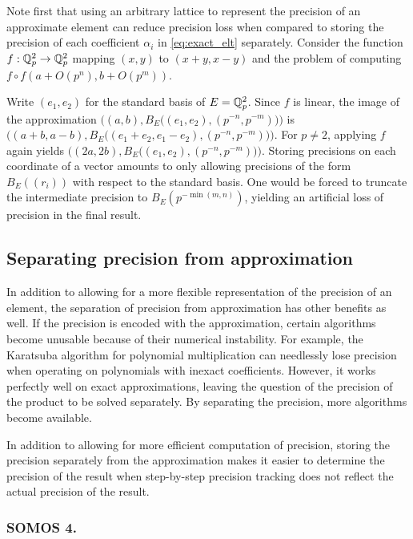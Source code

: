 \documentclass{lms}
\begin{document}
Note first that using an arbitrary lattice to represent the precision of an approximate element
can reduce precision loss when compared to storing the precision of each coefficient
$\alpha_i$ in \eqref{eq:exact_elt} separately.  Consider the function 
$f : \mathbb Q_p^2 \to \mathbb Q_p^2$ mapping $(x,y)$ to $(x+y, x-y)$ and the problem of computing
$f \circ f(a + O(p^n), b + O(p^m))$.

Write $(e_1, e_2)$ for the standard basis of $E=\mathbb Q_p^2$.  Since $f$ is linear, the image of
the approximation $\bigl((a,b), B_E\bigl((e_1,e_2),(p^{-n}, p^{-m})\bigr)\bigr)$ is
$\bigl((a+b, a-b), B_E\bigl((e_1+e_2, e_1-e_2), (p^{-n}, p^{-m})\bigr)\bigr)$.
For $p \ne 2$, applying $f$ again yields $\bigl((2a, 2b), B_E\bigl((e_1, e_2), (p^{-n}, p^{-m})\bigr)\bigr)$.
Storing precisions on each coordinate of a vector amounts to only allowing precisions of the form
$B_E((r_i))$ with respect to the standard basis.  One would be forced to truncate the intermediate precision
to $B_E(p^{-\min(m, n)})$, yielding an artificial loss of precision in the final result.

\subsection{Separating precision from approximation}
\label{ssec:separation}

In addition to allowing for a more flexible representation of the precision of an element,
the separation of precision from approximation has other benefits as well.  If the precision
is encoded with the approximation, certain algorithms become unusable because of their
numerical instability.  For example, the Karatsuba algorithm for polynomial multiplication \cite{karatsuba-ofman:62a}
can needlessly lose precision when operating on polynomials with inexact coefficients.
However, it works perfectly well on exact approximations, leaving the question of the precision of
the product to be solved separately.  By separating the precision, more algorithms become available.

In addition to allowing for more efficient computation of precision, storing the precision separately from the
approximation makes it easier to determine the precision of the result when step-by-step precision tracking
does not reflect the actual precision of the result.

\subsubsection*{SOMOS 4.}
\end{document}
